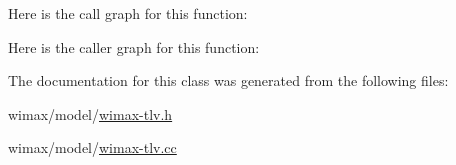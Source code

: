 Here is the call graph for this function\+:




Here is the caller graph for this function\+:




The documentation for this class was generated from the following files\+:\begin{DoxyCompactItemize}
\item 
wimax/model/\hyperlink{wimax-tlv_8h}{wimax-\/tlv.\+h}\item 
wimax/model/\hyperlink{wimax-tlv_8cc}{wimax-\/tlv.\+cc}\end{DoxyCompactItemize}
